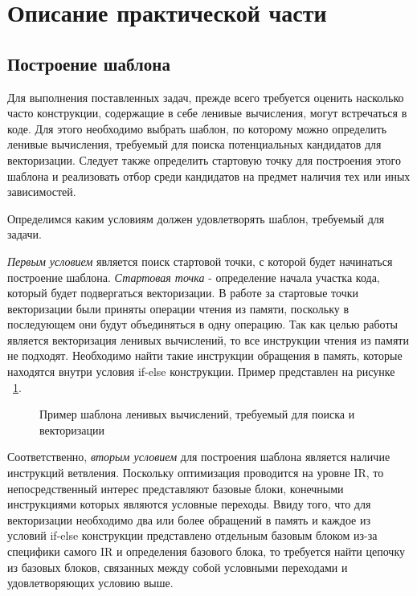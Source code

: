 \section{Описание практической части}
\label{sec:Chapter4} 


\subsection{Построение шаблона}
Для выполнения поставленных задач, прежде всего требуется оценить насколько часто конструкции, содержащие в себе ленивые вычисления, могут встречаться в коде. Для этого необходимо выбрать шаблон, по которому можно определить ленивые вычисления, требуемый для поиска потенциальных кандидатов для векторизации. Следует также определить стартовую точку для построения этого шаблона и реализовать отбор среди кандидатов на предмет наличия тех или иных зависимостей.

Определимся каким условиям должен удовлетворять шаблон, требуемый для задачи. 

\textit{Первым условием} является поиск стартовой точки, с которой будет начинаться построение шаблона. \textit{Стартовая точка} - определение начала участка кода, который будет подвергаться векторизации. В работе за стартовые точки векторизации были приняты операции чтения из памяти, поскольку в последующем они будут объединяться в одну операцию. Так как целью работы является векторизация ленивых вычислений, то все инструкции чтения из памяти не подходят. Необходимо найти такие инструкции обращения в память, которые находятся внутри условия if-else конструкции. Пример представлен на рисунке ~\ref{4lazy}.

\begin{figure}[!htb]
    \centering
    
    \caption{Пример шаблона ленивых вычислений, требуемый для поиска и векторизации}
    \label{4lazy}
\end{figure}

Соответственно, \textit{вторым условием} для построения шаблона является наличие инструкций ветвления. Поскольку оптимизация проводится на уровне IR, то непосредственный интерес представляют базовые блоки, конечными инструкциями которых являются условные переходы. Ввиду того, что для векторизации необходимо два или более обращений в память и каждое из условий if-else конструкции представлено отдельным базовым блоком из-за специфики самого IR и определения базового блока, то требуется найти цепочку из базовых блоков, связанных между собой условными переходами и удовлетворяющих условию выше.

